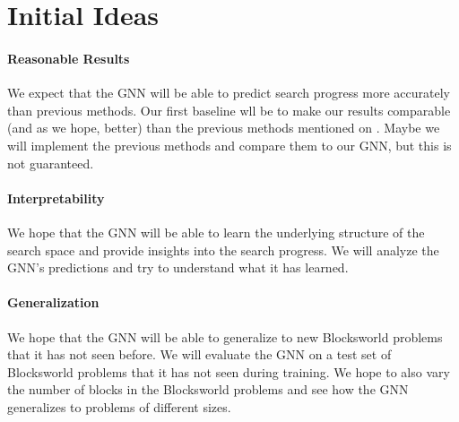 \documentclass[12pt]{article}
\begin{document}
\section{Initial Ideas}

\paragraph{Reasonable Results} We expect that the GNN will be able to predict search progress more accurately than previous methods. Our first baseline wll be to make our results comparable (and as we hope, better) than the previous methods mentioned on \citet{sudry2022learning}. Maybe we will implement the previous methods and compare them to our GNN, but this is not guaranteed.

\paragraph{Interpretability} We hope that the GNN will be able to learn the underlying structure of the search space and provide insights into the search progress. We will analyze the GNN's predictions and try to understand what it has learned.

\paragraph{Generalization} We hope that the GNN will be able to generalize to new Blocksworld problems that it has not seen before. We will evaluate the GNN on a test set of Blocksworld problems that it has not seen during training. We hope to also vary the number of blocks in the Blocksworld problems and see how the GNN generalizes to problems of different sizes.


\end{document}
